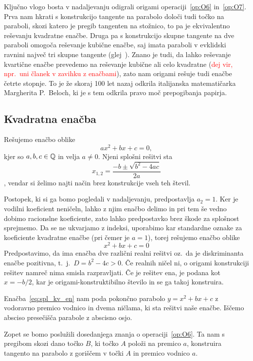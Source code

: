 Ključno vlogo bosta v nadaljevanju odigrali origami operaciji~\ref{op:O6} in~\ref{op:O7}. Prva nam hkrati s konstrukcijo tangente na parabolo določi tudi točko na paraboli, skozi katero je pregib tangenten na stožnico, to pa je ekvivalentno reševanju kvadratne enačbe. Druga pa s konstrukcijo skupne tangente na dve paraboli omogoča reševanje kubične enačbe, saj imata paraboli v evklidski ravnini največ tri skupne tangente (glej~\cite[str.\ 149--150]{geometricconstructions}). Znano je tudi, da lahko reševanje kvartične enačbe prevedemo na reševanje kubične ali celo kvadratne (\textcolor{red}{dej vir, npr.\ uni članek v zavihku z enačbami}), zato nam origami rešuje tudi enačbe četrte stopnje. To je že skoraj 100 let nazaj odkrila italijanska matematičarka Margherita P.\ Beloch, ki je s tem odkrila pravo moč prepogibanja papirja.

\subsection{Kvadratna enačba}

Rešujemo enačbo oblike
$$ a x^2 + b x + c = 0, $$
kjer so $a, b, c \in \mathbb Q$ in velja $a \ne 0$.  Njeni splošni rešitvi sta
$$ x_{1,2} = \frac{-b \pm \sqrt{b^2 - 4ac}}{2a}$$, vendar si želimo najti način brez konstrukcije vseh teh števil.

Postopek, ki si ga bomo pogledali v nadaljevanju, predpostavlja $a_2 = 1$. Ker je vodilni koeficient neničeln, lahko z njim enačbo delimo in pri tem še vedno dobimo racionslne koeficiente, zato lahko predpostavko brez škode za splošnost sprejmemo. Da se ne ukvarjamo z indeksi, uporabimo kar standardne oznake za koeficiente kvadratne enačbe (pri čemer je $a = 1$), torej rešujemo enačbo oblike
\begin{equation}
    \label{eq:spl_kv_en}
    x^2 + bx + c = 0
\end{equation}
Predpostavimo, da ima enačba dve različni realni rešitvi oz.\ da je diskriminanta enačbe pozitivna, t.\ j.\ $D = b^2 - 4c > 0$. Če realnih ničel ni, o origami konstrukciji rešitev namreč nima smisla razpravljati. Če je rešitev ena, je podana kot $x = -b/2$, kar je origami-konstruktibilno število in se ga takoj konstruira.

Enačba~\ref{eq:spl_kv_en} nam poda pokončno parabolo $y = x^2 + bx + c$ z vodoravno premico vodnico in dvema ničlama, ki sta rešitvi naše enačbe. Iščemo absciso presečišča parabole z abscisno osjo.

Zopet se bomo poslužili dosedanjega znanja o operaciji~\ref{op:O6}. Ta nam s pregibom skozi dano točko $B$, ki točko $A$ položi na premico $a$, konstruira tangento na parabolo z goriščem v točki $A$ in premico vodnico $a$.


